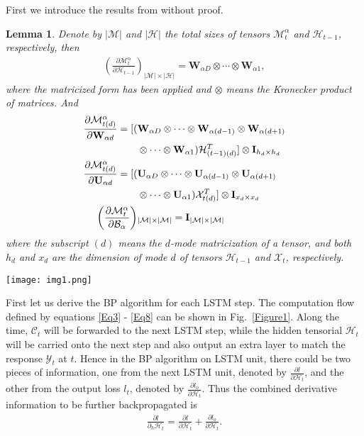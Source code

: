 \documentclass[journal]{IEEEtran}
\newtheorem{lemma}{Lemma}
\begin{document}
First we introduce the results from \cite{Kolda2006} without proof.
\begin{lemma} Denote by $|\mathcal{M}|$ and $|\mathcal{H}|$ the total sizes of tensors $\mathcal{M}^{\alpha}_t$ and $\mathcal{H}_{t-1}$, respectively, then
\begin{align}
\left(\frac{\partial \mathcal{M}^{\alpha}_t}{\partial \mathcal{H}_{t-1}}\right)_{|\mathcal{M}| \times |\mathcal{H}|} = \mathbf W_{\alpha D}\otimes \cdots \otimes \mathbf W_{\alpha 1}, \label{Eq19}
\end{align}
where the matricized form has been applied and $\otimes$ means the Kronecker product of matrices. And
\begin{align}
\frac{\partial \mathcal{M}^{\alpha}_{t(d)}}{\partial \mathbf W_{\alpha d}} = [(&\mathbf W_{\alpha D} \otimes \cdots \otimes \mathbf W_{\alpha (d-1)}\otimes \mathbf W_{\alpha (d+1)} \notag\\
& \otimes \cdots \otimes \mathbf W_{\alpha 1}) \mathcal{H}^T_{(t-1)(d)}]\otimes \mathbf I_{h_d\times h_d} \label{Eq20}\\
\frac{\partial \mathcal{M}^{\alpha}_{t(d)}}{\partial \mathbf U_{\alpha d}} = [(&\mathbf U_{\alpha D} \otimes \cdots \otimes \mathbf U_{\alpha (d-1)}\otimes \mathbf U_{\alpha (d+1)} \notag\\
& \otimes \cdots \otimes \mathbf U_{\alpha 1})\mathcal{X}^T_{t(d)}]\otimes \mathbf I_{x_d\times x_d} \label{Eq21}\\
\left(\frac{\partial \mathcal{M}^{\alpha}_t}{\partial \mathcal{B}_{\alpha}}\right)&_{|\mathcal{M}| \times |\mathcal{M}|} = \mathbf I_{|\mathcal{M}|\times |\mathcal{M}|} \label{Eq22}
\end{align}
where the subscript $(d)$ means the $d$-mode matricization of a tensor, and both $h_d$ and $x_d$ are the dimension of mode $d$ of tensors $\mathcal{H}_{t-1}$ and $\mathcal{X}_t$, respectively.
\end{lemma}

\begin{figure*}[t]
\centering
\texttt{[image: img1.png]}
\caption{LSTM Computation Flow. 
}
\label{Figure1}
\end{figure*}

First let us derive the BP algorithm for each LSTM step. The computation flow defined by equations \eqref{Eq3} - \eqref{Eq8} can be shown in Fig.~\ref{Figure1}. Along the time, $\mathcal{C}_t$ will be forwarded to the next LSTM step, while the hidden tensorial $\mathcal{H}_t$ will be carried onto the next step and also output an extra layer to match the response $\mathcal{Y}_t$ at $t$. Hence in the BP algorithm on LSTM unit, there could be two pieces of information, one from the next LSTM unit, denoted by $\frac{\partial l}{\partial \mathcal{H}_t}$, and the other from the output loss $l_t$, denoted by  $\frac{\partial l_o}{\partial \mathcal{H}_t}$. Thus the combined derivative information to be further backpropagated is
\begin{align}
\frac{\partial l}{\partial_h \mathcal{H}_t} =  \frac{\partial l}{\partial \mathcal{H}_t} + \frac{\partial l_o}{\partial \mathcal{H}_t}. \label{Eq23}
\end{align}
\end{document}
